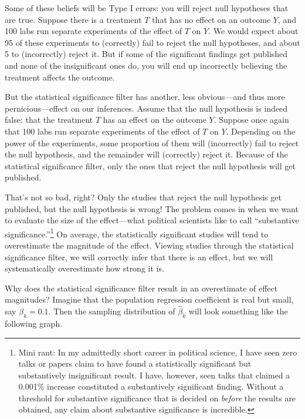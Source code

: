 \documentclass[12pt,oneside,openany]{book}
\let\rmarkdownfootnote\footnote%
\def\footnote{\protect\rmarkdownfootnote}
\begin{document}
Some of these beliefs will be Type I errors: you will reject null
hypotheses that are true. Suppose there is a treatment \(T\) that has no
effect on an outcome \(Y\), and 100 labs run separate experiments of the
effect of \(T\) on \(Y\). We would expect about 95 of these experiments
to (correctly) fail to reject the null hypotheses, and about 5 to
(incorrectly) reject it. But if some of the significant findings get
published and none of the insignificant ones do, you will end up
incorrectly believing the treatment affects the outcome.

But the statistical significance filter has another, less obvious---and
thus more pernicious---effect on our inferences. Assume that the null
hypothesis is indeed false: that the treatment \(T\) has an effect on
the outcome \(Y\). Suppose once again that 100 labs run separate
experiments of the effect of \(T\) on \(Y\). Depending on the power of
the experiments, some proportion of them will (incorrectly) fail to
reject the null hypothesis, and the remainder will (correctly) reject
it. Because of the statistical significance filter, only the ones that
reject the null hypothesis will get published.

That's not so bad, right? Only the studies that reject the null
hypothesis get published, but the null hypothesis is wrong! The problem
comes in when we want to evaluate the size of the effect---what
political scientists like to call ``substantive
significance.''\footnote{Mini rant: In my admittedly short career in
  political science, I have seen zero talks or papers claim to have
  found a statistically significant but substantively insignificant
  result. I have, however, seen talks that claimed a 0.001\% increase
  constituted a substantively significant finding. Without a threshold
  for substantive significance that is decided on \emph{before} the
  results are obtained, any claim about substantive significance is
  incredible.} On average, the statistically significant studies will
tend to overestimate the magnitude of the effect. Viewing studies
through the statistical significance filter, we will correctly infer
that there is an effect, but we will systematically overestimate how
strong it is.

Why does the statistical significance filter result in an overestimate
of effect magnitudes? Imagine that the population regression coefficient
is real but small, say \(\beta_k = 0.1\). Then the sampling distribution
of \(\hat{\beta}_k\) will look something like the following graph.
\end{document}
